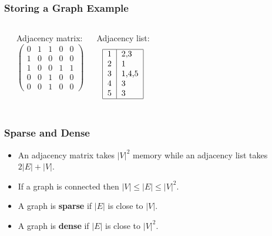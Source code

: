 \documentclass{beamer}
\begin{document}
\begin{frame}
\frametitle{Storing a Graph Example}
\begin{columns}[c]
\begin{center}
\end{center}

Adjacency matrix:
\[
\begin{pmatrix}
0 & 1 & 1 & 0 & 0 \\
1 & 0 & 0 & 0 & 0 \\
1 & 0 & 0 & 1 & 1 \\
0 & 0 & 1 & 0 & 0 \\
0 & 0 & 1 & 0 & 0 
\end{pmatrix}
\]

Adjacency list:
\[
\begin{tabular}{| l | l |}
\hline
1 & 2,3 \\
2 & 1 \\
3 & 1,4,5 \\
4 & 3 \\
5 & 3 \\
\hline
\end{tabular}
\]
\end{columns}
\end{frame}


\begin{frame}
\frametitle{Sparse and Dense}

\begin{itemize}
\item An adjacency matrix takes $|V|^2$ memory while an adjacency list takes $2|E| + |V|$.
\item If a graph is connected then $|V| \leq |E| \leq |V|^2$.
\item A graph is \textbf{sparse} if $|E|$ is close to $|V|$.
\item A graph is \textbf{dense} if $|E|$ is close to $|V|^2$.
\end{itemize}
\end{frame}
\end{document}
